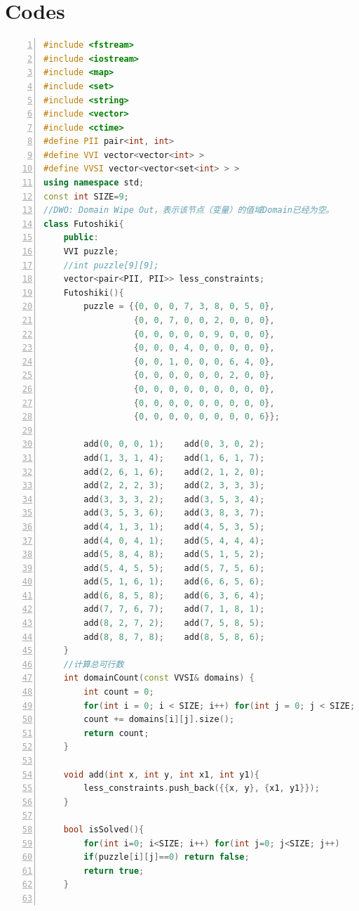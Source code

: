 \documentclass[UTF8]{ctexart}
\begin{document}
\section{Codes}
\begin{lstlisting}[language = C++, numbers=left,numberstyle=\tiny,keywordstyle=\color{blue!70},commentstyle=\color{red!50!green!50!blue!50},frame=shadowbox,rulesepcolor=\color{red!20!green!20!blue!20},basicstyle=\ttfamily]
#include <fstream>
#include <iostream>
#include <map>
#include <set>
#include <string>
#include <vector>
#include <ctime>
#define PII pair<int, int>
#define VVI vector<vector<int> >
#define VVSI vector<vector<set<int> > >
using namespace std;
const int SIZE=9;
//DWO: Domain Wipe Out，表示该节点（变量）的值域Domain已经为空。
class Futoshiki{
    public:
    VVI puzzle;
    //int puzzle[9][9];
    vector<pair<PII, PII>> less_constraints;
    Futoshiki(){
        puzzle = {{0, 0, 0, 7, 3, 8, 0, 5, 0},
                  {0, 0, 7, 0, 0, 2, 0, 0, 0},
                  {0, 0, 0, 0, 0, 9, 0, 0, 0},
                  {0, 0, 0, 4, 0, 0, 0, 0, 0},
                  {0, 0, 1, 0, 0, 0, 6, 4, 0},
                  {0, 0, 0, 0, 0, 0, 2, 0, 0},
                  {0, 0, 0, 0, 0, 0, 0, 0, 0},
                  {0, 0, 0, 0, 0, 0, 0, 0, 0},
                  {0, 0, 0, 0, 0, 0, 0, 0, 6}};
        
        add(0, 0, 0, 1);	add(0, 3, 0, 2);
        add(1, 3, 1, 4);	add(1, 6, 1, 7);
        add(2, 6, 1, 6);	add(2, 1, 2, 0);
        add(2, 2, 2, 3);	add(2, 3, 3, 3);
        add(3, 3, 3, 2);	add(3, 5, 3, 4);
        add(3, 5, 3, 6);	add(3, 8, 3, 7);
        add(4, 1, 3, 1);	add(4, 5, 3, 5);
        add(4, 0, 4, 1);	add(5, 4, 4, 4);
        add(5, 8, 4, 8);	add(5, 1, 5, 2);
        add(5, 4, 5, 5);	add(5, 7, 5, 6);
        add(5, 1, 6, 1);	add(6, 6, 5, 6);
        add(6, 8, 5, 8);	add(6, 3, 6, 4);
        add(7, 7, 6, 7);	add(7, 1, 8, 1);
        add(8, 2, 7, 2);	add(7, 5, 8, 5);
        add(8, 8, 7, 8);	add(8, 5, 8, 6);
    }
    //计算总可行数
    int domainCount(const VVSI& domains) {
        int count = 0;
        for(int i = 0; i < SIZE; i++) for(int j = 0; j < SIZE; j++)
        count += domains[i][j].size();
        return count;
    }
    
    void add(int x, int y, int x1, int y1){
        less_constraints.push_back({{x, y}, {x1, y1}});
    }
    
    bool isSolved(){
        for(int i=0; i<SIZE; i++) for(int j=0; j<SIZE; j++) 
        if(puzzle[i][j]==0) return false;
        return true;
    }
    

\end{lstlisting}
\end{document}
